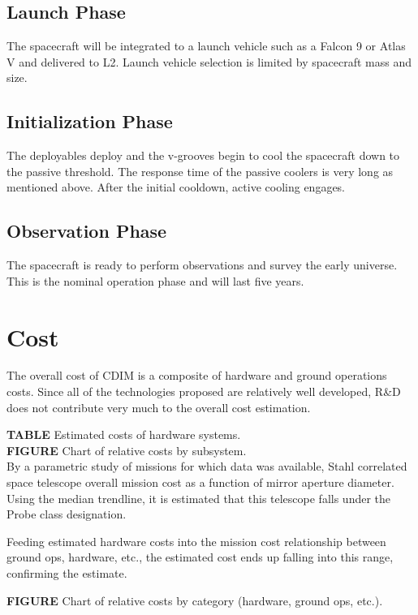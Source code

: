 \documentclass{ws-jai}
\begin{document}
\subsection{Launch Phase}
\label{sS:launch}
The spacecraft will be integrated to a launch vehicle such as a Falcon 9 or Atlas V and delivered to L2. Launch vehicle selection is limited by spacecraft mass and size.

\subsection{Initialization Phase}
\label{sS:initphase}
The deployables deploy and the v-grooves begin to cool the spacecraft down to the passive threshold. The response time of the passive coolers is very long as mentioned above. After the initial cooldown, active cooling engages.

\subsection{Observation Phase}
\label{sS:obsphase}
The spacecraft is ready to perform observations and survey the early universe. This is the nominal operation phase and will last five years.

\section{Cost}
\label{S:cost}
The overall cost of CDIM is a composite of hardware and ground operations costs. Since all of the technologies proposed are relatively well developed, R\&D does not contribute very much to the overall cost estimation.

\textbf{TABLE} Estimated costs of hardware systems.\\

\textbf{FIGURE} Chart of relative costs by subsystem.\\

By a parametric study of missions for which data was available, Stahl correlated space telescope overall mission cost as a function of mirror aperture diameter. Using the median trendline, it is estimated that this telescope falls under the Probe class designation.

Feeding estimated hardware costs into the mission cost relationship between ground ops, hardware, etc., the estimated cost ends up falling into this range, confirming the estimate.

\textbf{FIGURE} Chart of relative costs by category (hardware, ground ops, etc.).
\end{document}

